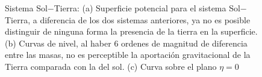 \begin{figure}[H]
\centering
{}
\caption{Sistema Sol$-$Tierra: (a) Superficie potencial para el sistema Sol$-$Tierra, a diferencia de los dos sistemas anteriores, ya no es posible distinguir de ninguna forma la presencia de la tierra en la superficie. (b) Curvas de nivel, al haber $6$ ordenes de magnitud de diferencia entre las masas, no es perceptible la aportación gravitacional de la Tierra comparada con la del sol. (c) Curva sobre el plano $\eta = 0$}
\label{superficie, cn, plane s-j}
\end{figure}

